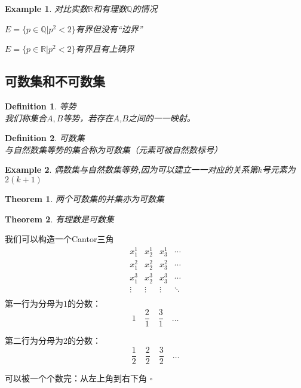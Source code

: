 \documentclass[11pt,hyperref,a4paper,UTF8]{ctexart}
\newtheorem{theorem}{Theorem}[subsection]
\newtheorem{example}{Example}[subsection]
\newtheorem{definition}{Definition}[subsection]
\newenvironment{cproof}{%
\heiti{证明}\kaishu
}{%
  \hfill $\square$
  \par\bigskip
}
\newcommand{\RR}{\mathbb{R}}
\newcommand{\QQ}{\mathbb{Q}}
\begin{document}
\begin{CJK}{UTF8}{gkai}
\begin{example}
  对比实数$\RR$和有理数$\QQ$的情况

  $E=\{p\in \mathbb{Q}  |p^2<2\}$有界但没有“边界”

  $E=\{p\in \mathbb{R}  |p^2<2\}$有界且有上确界
\end{example}

\subsection{可数集和不可数集}
\begin{definition}
  等势\\

  我们称集合$A,B$等势，若存在$A$,$B$之间的一一映射。
\end{definition}

\begin{definition}
  可数集\\

  与自然数集等势的集合称为可数集（元素可被自然数标号）
\end{definition}

\begin{example}
  偶数集与自然数集等势,因为可以建立一一对应的关系第$k$号元素为$2(k+1)$
\end{example}

\begin{theorem}
  两个可数集的并集亦为可数集
\end{theorem}

\begin{theorem}
  有理数是可数集
\end{theorem}

\begin{cproof}
  我们可以构造一个Cantor三角
  \[\begin{matrix}
    x_1^1&x_2^1&x_3^1&\cdots\\
    x_1^2&x_2^2&x_3^2&\cdots\\
    x_1^3&x_2^3&x_3^3&\cdots\\
    \vdots&\vdots&\vdots&\ddots\\ 
  \end{matrix}\]
  第一行为分母为$1$的分数：
  \[1 \quad \frac{2}{1} \quad \frac{3}{1} \quad \ldots\]

  第二行为分母为2的分数：
  \[\frac{1}{2} \quad \frac{2}{2} \quad \frac{3}{2} \quad \ldots\]

  可以被一个个数完：从左上角到右下角
\end{cproof}


\end{CJK}
\end{document}
